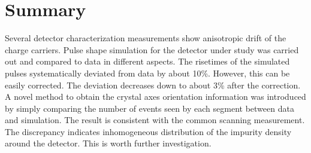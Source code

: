 \section{Summary}
\label{sec:psa:sum}
Several detector characterization measurements show anisotropic drift of the charge carriers. Pulse shape simulation for the detector under study was carried out and compared to data in different aspects. The risetimes of the simulated pulses systematically deviated from data by about 10\%. However, this can be easily corrected. The deviation decreases down to about 3\% after the correction. A novel method to obtain the crystal axes orientation information was introduced by simply comparing the number of events seen by each segment between data and simulation. The result is consistent with the common scanning measurement. The discrepancy indicates inhomogeneous distribution of the impurity density around the detector. This is worth further investigation.

